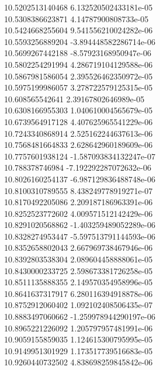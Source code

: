 {10.5202513140468 6.132520502433181e-05
 \\
10.5308386623871 4.14787900808733e-05
 \\
10.5424668255604 9.541556210024282e-06
 \\
10.5593256889204 -3.894448582286714e-06
 \\
10.5699267442188 -8.57923168950947e-06
 \\
10.5802254291994 4.286719104129588e-06
 \\
10.5867981586054 2.395526462350972e-05
 \\
10.5975199986057 3.278722579125315e-05
 \\
10.608565542641 2.39167802646989e-05
 \\
10.6308166955303 1.040610004565679e-05
 \\
10.6739564917128 4.407625965541229e-06
 \\
10.7243340868914 2.525162244637613e-06
 \\
10.7568481664833 2.628642960189609e-06
 \\
10.7757601938124 -1.587093834132247e-07
 \\
10.788378746984 -7.192292287072632e-06
 \\
10.8026160254137 -6.987129836488748e-06
 \\
10.8100310789555 8.438249778919271e-07
 \\
10.8170492205086 2.209187186963391e-06
 \\
10.8252523772602 4.009571512142429e-06
 \\
10.8291020568862 -1.403259489052289e-06
 \\
10.8328274953447 -5.597513791144593e-06
 \\
10.8352658802043 2.667969738467946e-06
 \\
10.8392803538304 2.089604458888061e-05
 \\
10.8430000233725 2.598673381726258e-05
 \\
10.8511135888355 2.149570354958996e-05
 \\
10.8641637317917 6.280116394918878e-06
 \\
10.8752912060402 1.092102408506435e-07
 \\
10.8883497060662 -1.259978944290197e-06
 \\
10.8965221226092 1.205797957481991e-06
 \\
10.9059155859035 1.124615300795995e-05
 \\
10.9149951301929 1.173517739516683e-05
 \\
10.9260440732502 4.838698259845842e-06
}
